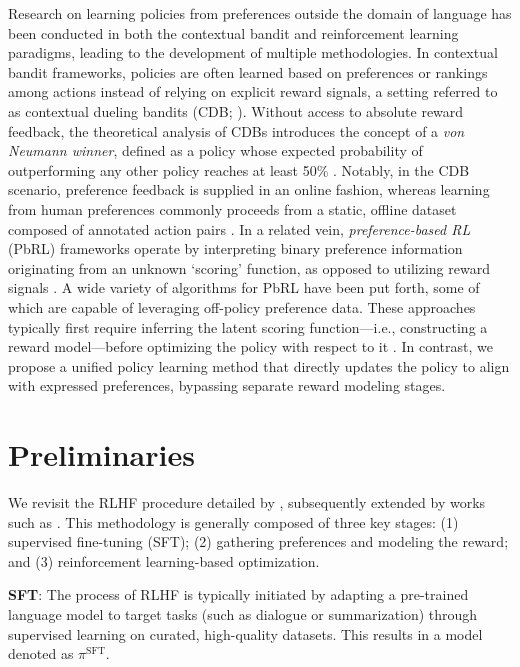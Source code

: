 Research on learning policies from preferences outside the domain of language has been conducted in both the contextual bandit and reinforcement learning paradigms, leading to the development of multiple methodologies. In contextual bandit frameworks, policies are often learned based on preferences or rankings among actions instead of relying on explicit reward signals, a setting referred to as contextual dueling bandits (CDB; \cite{yue2012karmed, dudik2015contextual}). Without access to absolute reward feedback, the theoretical analysis of CDBs introduces the concept of a \textit{von Neumann winner}, defined as a policy whose expected probability of outperforming any other policy reaches at least 50\% \citep{dudik2015contextual}. Notably, in the CDB scenario, preference feedback is supplied in an online fashion, whereas learning from human preferences commonly proceeds from a static, offline dataset composed of annotated action pairs \citep{yan2022human}. In a related vein, \textit{preference-based RL} (PbRL) frameworks operate by interpreting binary preference information originating from an unknown `scoring' function, as opposed to utilizing reward signals \citep{BusaFekete2014, ruiz2023dueling}. A wide variety of algorithms for PbRL have been put forth, some of which are capable of leveraging off-policy preference data. These approaches typically first require inferring the latent scoring function—i.e., constructing a reward model—before optimizing the policy with respect to it \citep{jain2013learning, BusaFekete2014, christiano2017deep, sadigh2017active, kupcsik2018learning}. In contrast, we propose a unified policy learning method that directly updates the policy to align with expressed preferences, bypassing separate reward modeling stages.

\section{Preliminaries}\label{section:prelims}

We revisit the RLHF procedure detailed by \citeauthor{ziegler2020finetuning}, subsequently extended by works such as \citep{stiennon2022learning, bai2022training, ouyang2022training}. This methodology is generally composed of three key stages: (1) supervised fine-tuning (SFT); (2) gathering preferences and modeling the reward; and (3) reinforcement learning-based optimization.

\textbf{SFT}: The process of RLHF is typically initiated by adapting a pre-trained language model to target tasks (such as dialogue or summarization) through supervised learning on curated, high-quality datasets. This results in a model denoted as $\pi^\text{SFT}$.

